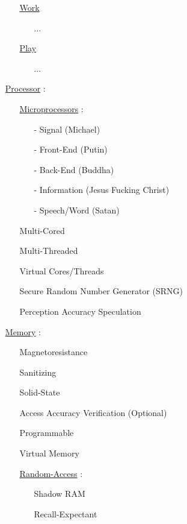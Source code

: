 \documentclass[11pt]{article}
\begin{document}
\begin{enumerate}
\begin{enumerate}
		\item[] \ul{Work}
		\begin{enumerate}
			\item[] ...
		\end{enumerate}
	
		\item[] \ul{Play}
		\begin{enumerate}
			\item[] ...
		\end{enumerate}
	
	\end{enumerate}

	\item[] \ul{Processor} :
	\begin{enumerate}
		\item[] \ul{Microprocessors} :
		\begin{enumerate}
			\item[-] Signal (Michael)
			\item[-] Front-End (Putin)
			\item[-] Back-End (Buddha)
			\item[-] Information (Jesus Fucking Christ)
			\item[-] Speech/Word (Satan)
		\end{enumerate}
	
		\item[] Multi-Cored
		\item[] Multi-Threaded
		\item[] Virtual Cores/Threads
		\item[] Secure Random Number Generator (SRNG)
		\item[] Perception Accuracy Speculation
		
	\end{enumerate}
	
	\item[] \ul{Memory} :
	\begin{enumerate}
		\item[] Magnetoresistance
		\item[] Sanitizing
		\item[] Solid-State
		\item[] Access Accuracy Verification (Optional)
		\item[] Programmable
		\item[] Virtual Memory
	
		\item[] \ul{Random-Access} :
		\begin{enumerate}
			\item[] Shadow RAM
			\item[] Recall-Expectant
		\end{enumerate}
		

\end{enumerate}
\end{enumerate}
\end{document}
